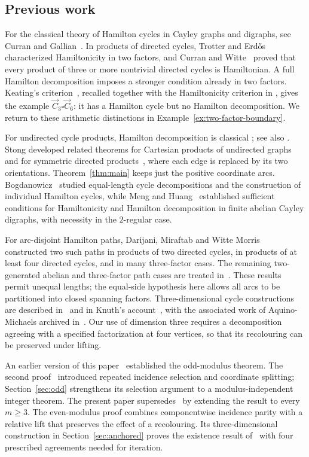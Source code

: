 \documentclass[11pt,reqno]{amsart}
\numberwithin{equation}{section}
\theoremstyle{definition}
\theoremstyle{remark}
\begin{document}
\subsection{Previous work}
For the classical theory of Hamilton cycles in Cayley graphs and
digraphs, see Curran and Gallian~\cite{CG96}. In products of directed
cycles, Trotter and Erd\H{o}s~\cite{TE78} characterized Hamiltonicity
in two factors, and Curran and Witte~\cite{CW85} proved that every
product of three or more nontrivial directed cycles is Hamiltonian. A full
Hamilton decomposition imposes a stronger condition already in two
factors. Keating's criterion~\cite{Keating85}, recalled together with the
Hamiltonicity criterion in \cite[Theorems~2.1 and~2.3]{DMM22}, gives the
example $\vec C_3\square\vec C_6$: it has a Hamilton cycle but no Hamilton
decomposition. We return to these arithmetic distinctions in
Example~\ref{ex:two-factor-boundary}.

For undirected cycle products, Hamilton decomposition is classical
\cite{AS82}; see also \cite[Theorem~2.5]{DMM22}. Stong developed related
theorems for Cartesian products of undirected graphs~\cite{Stong91} and
for symmetric directed products~\cite{Stong06}, where each edge is
replaced by its two orientations. Theorem~\ref{thm:main} keeps just the
positive coordinate arcs. Bogdanowicz~\cite{Bog17,Bog20} studied
equal-length cycle decompositions and the construction of individual
Hamilton cycles, while Meng and Huang~\cite{MH97} established sufficient
conditions for Hamiltonicity and Hamilton decomposition in finite
abelian Cayley digraphs, with necessity in the $2$-regular case.

For arc-disjoint Hamilton paths, Darijani,
Miraftab and Witte Morris~\cite{DMM22} constructed two such paths in
products of two directed cycles, in products of at least four directed
cycles, and in many three-factor cases. The remaining two-generated
abelian and three-factor path cases are treated in~\cite{ParkPaths26}.
These results permit unequal lengths; the equal-side hypothesis here
allows all arcs to be partitioned into closed spanning factors.
Three-dimensional cycle constructions are described in~\cite{Park3}
and in Knuth's account~\cite{Knuth26}, with the associated work of
Aquino-Michaels archived in~\cite{Aquino26}. Our use of dimension three
requires a decomposition agreeing with a specified factorization at
four vertices, so that its recolouring can be preserved under lifting.

An earlier version of this paper~\cite{ParkVtwo} established the
odd-modulus theorem. The second proof~\cite{ParkShort} introduced
repeated incidence selection and coordinate splitting; Section~\ref{sec:odd}
strengthens its selection argument to a modulus-independent integer
theorem. The present paper supersedes~\cite{ParkVtwo} by extending the
result to every $m\ge3$. The even-modulus proof combines componentwise
incidence parity with a relative lift that preserves the effect of a
recolouring. Its three-dimensional construction in
Section~\ref{sec:anchored} proves the existence result of~\cite{Park3}
with four prescribed agreements needed for iteration.
\end{document}
